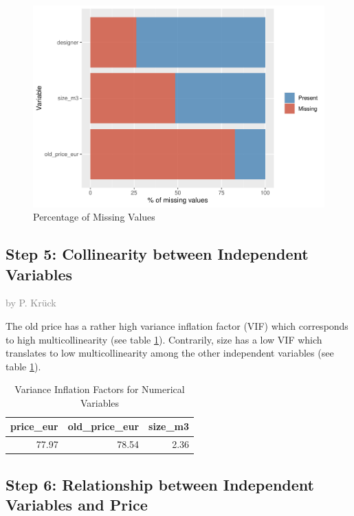 \documentclass[a4paper, nobind]{templates/ociamthesis}
\begin{document}
\begin{figure}
\includegraphics[width=1\linewidth]{_main_files/figure-latex/missing-values-1} \caption{Percentage of Missing Values}\label{fig:missing-values}
\end{figure}

\hypertarget{collinearity}{%
\subsection{Step 5: Collinearity between Independent Variables}\label{collinearity}}

\textcolor{gray}{by P. Krück}

The old price has a rather high variance inflation factor (VIF) which corresponds to high multicollinearity (see table \ref{tab:vif}). Contrarily, size has a low VIF which translates to low multicollinearity among the other independent variables (see table \ref{tab:vif}).

\begin{table}

\caption{\label{tab:vif}Variance Inflation Factors for Numerical Variables}
\centering
\begin{tabular}[t]{r|r|r}
\hline
price\_eur & old\_price\_eur & size\_m3\\
\hline
77.97 & 78.54 & 2.36\\
\hline
\end{tabular}
\end{table}

\hypertarget{relationship}{%
\subsection{Step 6: Relationship between Independent Variables and Price}\label{relationship}}
\end{document}
